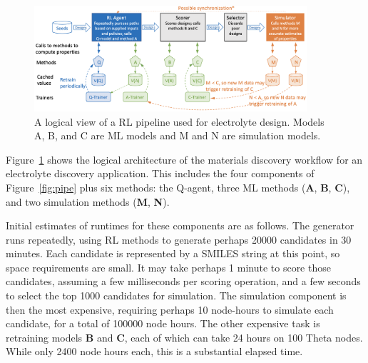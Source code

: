 \documentclass[10pt]{article}
\begin{document}
\begin{figure}
  \centering
  \includegraphics[width=0.9\textwidth,trim=0in 0in 0in 0in,clip]{./Figs/sketch.png}
  \vspace{-1.5ex}
  \caption{A logical view of a RL pipeline used for electrolyte design. Models A, B, and C are ML models and M and N are simulation models.}
\label{fig:sketch}
\end{figure}

Figure~\ref{fig:sketch} shows the logical architecture of the materials discovery workflow for an electrolyte discovery application.
This includes the four components of Figure~\ref{fig:pipe} plus six methods: 
the Q-agent, three ML methods (\textbf{A}, \textbf{B}, \textbf{C}), and two simulation methods (\textbf{M}, \textbf{N}).

Initial estimates of runtimes for these components are as follows. 
The generator runs repeatedly, using RL methods to generate perhaps \num{20000} candidates in 30 minutes.
Each candidate is represented by a SMILES string at this point, so space requirements are small.
It may take perhaps 1 minute to score those candidates, assuming a few milliseconds per scoring operation,
and a few seconds to select the top \num{1000} candidates for simulation.
The simulation component is then the most expensive, requiring perhaps 10 node-hours to simulate each candidate,
for a total of \num{100000} node hours.
The other expensive task is retraining models \textbf{B} and \textbf{C}, each of which can take 24 hours on 100 Theta nodes.
While only 2400 node hours each, this is a substantial elapsed time.
\end{document}
